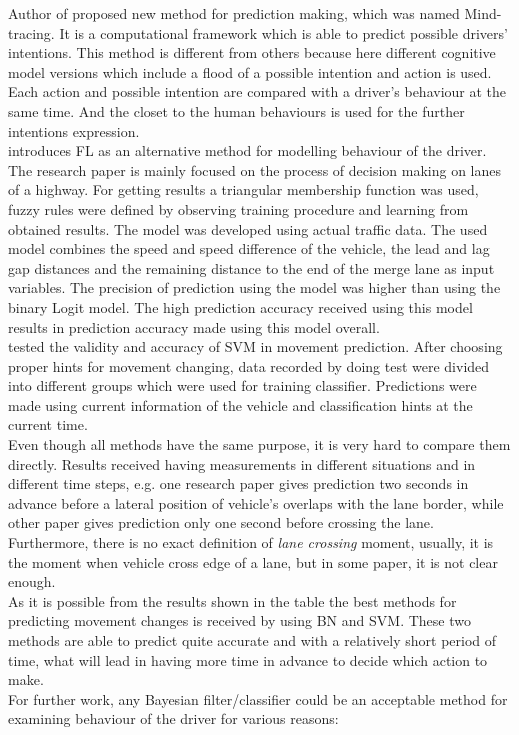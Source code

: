 Author of \cite{Mind} proposed new method for prediction making, which was named Mind-tracing. It is a computational framework which is able to predict possible drivers' intentions. This method is different from others because here different cognitive model versions which include a flood of a possible intention and action is used. Each action and possible intention are compared with a driver's behaviour at the same time. And the closet to the human behaviours is used for the further intentions expression. \\
\cite{Fuzz} introduces \gls{FL} as an alternative method for modelling behaviour of the driver. The research paper is mainly focused on the process of decision making on lanes of a highway. For getting results a triangular membership function was used, fuzzy rules were defined by observing training procedure and learning from obtained results. The model was developed using actual traffic data. The used model combines the speed and speed difference of the vehicle, the lead and lag gap distances and the remaining distance to the end of the merge lane as input variables. The precision of prediction using the model was
higher than using the binary Logit model. The high prediction accuracy received using this model results in prediction accuracy made using this model overall. \\
\cite{VectMash} tested the validity and  accuracy of \gls{SVM} in movement prediction. After choosing proper hints for movement changing, data recorded by doing test were divided into different groups which were used for training classifier. Predictions were made using current information of the vehicle and classification hints at the current time. \\
Even though all methods have the same purpose, it is very hard to compare them directly. Results received having measurements in different situations and in different time steps, e.g. one research paper gives prediction two seconds in advance before a lateral position of vehicle’s overlaps with the lane border, while other paper gives prediction only one second before crossing the lane. Furthermore, there is no exact definition of \textit{lane crossing} moment, usually, it is the moment when vehicle cross edge of a lane, but in some paper, it is not clear enough. \\
As it is possible from the results shown in the table the best methods for predicting movement changes is received by using \gls{BN} and \gls{SVM}. These two methods are able to predict quite accurate and with a relatively short period of time, what will lead in having more time in advance to decide which action to make. \\
For further work, any Bayesian filter/classifier could be an acceptable method for examining behaviour of the driver for various reasons: 

